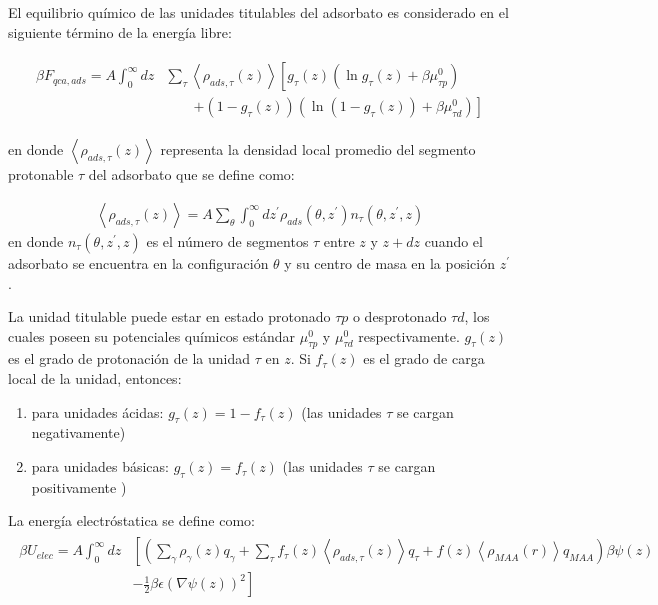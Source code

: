 El equilibrio qu\'imico de las unidades titulables del adsorbato  es considerado en el siguiente t\'ermino de la energ\'ia libre:

\begin{align}
	\begin{aligned}
		\beta F_{qca,ads} = A\int_0^\infty dz& \sum_\tau \left<\rho_{ads,\tau}(z)\right> \left[g_\tau(z)(\ln g_\tau(z)+ \beta\mu^0_{\tau p})\right.\\
		&\qquad\left.+(1-g_\tau(z))(\ln (1-g_\tau(z))+\beta\mu^0_{\tau d})\right]   
	\end{aligned}
\end{align} 

\noindent en donde $\left<\rho_{ads,\tau}(z)\right>$ representa la densidad local promedio del segmento protonable $\tau$ del adsorbato que se define como:

\begin{align}
	\left<\rho_{ads,\tau}(z)\right> = A\sum_\theta \int^\infty_0 dz^\prime  \rho_{ads}(\theta,z^\prime)n_\tau(\theta,z^\prime, z)
	\label{eq:film:segments_pro_si}
\end{align}
\noindent en donde $n_\tau(\theta,z^\prime, z)$ es el n\'umero de segmentos $\tau$ entre  $z$ y $z+ dz$ cuando el adsorbato se encuentra en la configuraci\'on $\theta$ y su centro de masa en la posici\'on $z^\prime$.

La unidad titulable puede estar en estado protonado $\tau p$ o desprotonado $\tau d$, los cuales poseen su potenciales qu\'imicos est\'andar $\mu^0_{\tau p}$ y $\mu^0_{\tau d}$ respectivamente. 
$g_\tau (z)$ es el grado de protonaci\'on de la unidad $\tau$ en $z$. Si $f_\tau (z)$ es el grado de carga local de la unidad, entonces:


\begin{enumerate}
	\item para unidades \'acidas: $g_\tau(z) = 1-f_\tau(z)$ (las unidades $\tau$ se cargan negativamente)
	\item para unidades b\'asicas: $g_\tau(z) = f_\tau(z)$ (las  unidades $\tau$ se cargan positivamente  )
\end{enumerate}


La energ\'ia electr\'ostatica se define como:
\begin{align}
	\begin{aligned}
		\beta U_{elec}= A\int_0^\infty dz&\left[\left(\sum_{\gamma } {\rho_\gamma(z) q_\gamma + \sum_\tau{f_\tau(z) \left<\rho_{ads,\tau}(z)\right> q_\tau} +  f(z)\left<\rho_{MAA}(r)\right>q_{MAA}}\right)\beta\psi(z) \right. \\ &\left.-\frac{1}{2}\beta\epsilon(\nabla\psi(z))^2 \right]
	\end{aligned}
\end{align} 

